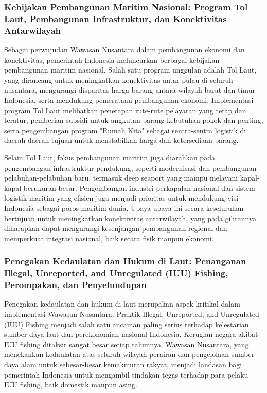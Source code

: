 \documentclass[12pt, a4paper]{article}
\begin{document}
\subsubsection*{Kebijakan Pembangunan Maritim Nasional: Program Tol Laut, Pembangunan Infrastruktur, dan Konektivitas Antarwilayah}

Sebagai perwujudan Wawasan Nusantara dalam pembangunan ekonomi dan konektivitas, pemerintah Indonesia meluncurkan berbagai kebijakan pembangunan maritim nasional. Salah satu program unggulan adalah Tol Laut, yang dirancang untuk meningkatkan konektivitas antar pulau di seluruh nusantara, mengurangi disparitas harga barang antara wilayah barat dan timur Indonesia, serta mendukung pemerataan pembangunan ekonomi. Implementasi program Tol Laut melibatkan penetapan rute-rute pelayaran yang tetap dan teratur, pemberian subsidi untuk angkutan barang kebutuhan pokok dan penting, serta pengembangan program "Rumah Kita" sebagai sentra-sentra logistik di daerah-daerah tujuan untuk menstabilkan harga dan ketersediaan barang.  

Selain Tol Laut, fokus pembangunan maritim juga diarahkan pada pengembangan infrastruktur pendukung, seperti modernisasi dan pembangunan pelabuhan-pelabuhan baru, termasuk deep seaport yang mampu melayani kapal-kapal berukuran besar. Pengembangan industri perkapalan nasional dan sistem logistik maritim yang efisien juga menjadi prioritas untuk mendukung visi Indonesia sebagai poros maritim dunia. Upaya-upaya ini secara keseluruhan bertujuan untuk meningkatkan konektivitas antarwilayah, yang pada gilirannya diharapkan dapat mengurangi kesenjangan pembangunan regional dan memperkuat integrasi nasional, baik secara fisik maupun ekonomi.  

\subsubsection*{Penegakan Kedaulatan dan Hukum di Laut: Penanganan Illegal, Unreported, and Unregulated (IUU) Fishing, Perompakan, dan Penyelundupan}

Penegakan kedaulatan dan hukum di laut merupakan aspek kritikal dalam implementasi Wawasan Nusantara. Praktik Illegal, Unreported, and Unregulated (IUU) Fishing menjadi salah satu ancaman paling serius terhadap kelestarian sumber daya laut dan perekonomian nasional Indonesia. Kerugian negara akibat IUU fishing ditaksir sangat besar setiap tahunnya. Wawasan Nusantara, yang menekankan kedaulatan atas seluruh wilayah perairan dan pengelolaan sumber daya alam untuk sebesar-besar kemakmuran rakyat, menjadi landasan bagi pemerintah Indonesia untuk mengambil tindakan tegas terhadap para pelaku IUU fishing, baik domestik maupun asing.  
\end{document}

